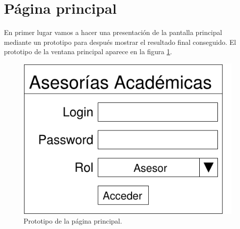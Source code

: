 \section{Página principal}

  \paragraph{}En primer lugar vamos a hacer una presentación de la pantalla
  principal mediante un prototipo para después mostrar el resultado final
  conseguido. El prototipo de la ventana principal aparece en la figura
  \ref{prototipoPaginaPrincipal}.

  \begin{figure}[!ht]
            \begin{center}
            \includegraphics[]{13.Disenyo_Interfaz/13.2.Pagina_Principal/pagina_principal.pdf}
            \caption{Prototipo de la página principal.}
            \label{prototipoPaginaPrincipal}
            \end{center}
         \end{figure}
